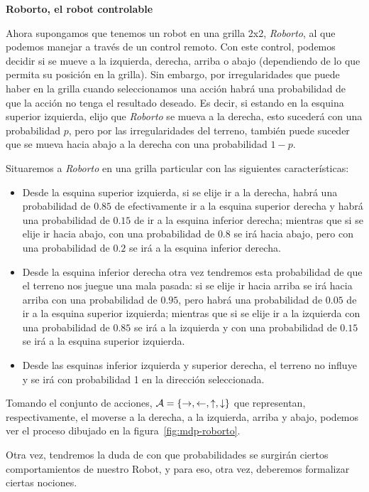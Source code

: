 \textbf{Roborto, el robot controlable}

Ahora supongamos que tenemos un robot en una grilla 2x2, \emph{Roborto}, al que
podemos manejar a través de un control remoto. Con este control, podemos
decidir si se mueve a la izquierda, derecha, arriba o abajo (dependiendo de lo
que permita su posición en la grilla). Sin embargo, por irregularidades que
puede haber en la grilla cuando seleccionamos una acción habrá una probabilidad
de que la acción no tenga el resultado deseado. Es decir, si estando en la
esquina superior izquierda, elijo que \emph{Roborto} se mueva a la derecha,
esto sucederá con una probabilidad $p$, pero por las irregularidades del
terreno, también puede suceder que se mueva hacia abajo a la derecha con una
probabilidad $1 - p$.

Situaremos a \emph{Roborto} en una grilla particular con las siguientes
características:

\begin{itemize}
	\item Desde la esquina superior izquierda, si se elije ir a la derecha, habrá una
	      probabilidad de $0.85$ de efectivamente ir a la esquina superior derecha y
	      habrá una probabilidad de $0.15$ de ir a la esquina inferior derecha; mientras
	      que si se elije ir hacia abajo, con una probabilidad de $0.8$ se irá hacia
	      abajo, pero con una probabilidad de $0.2$ se irá a la esquina inferior derecha.
	\item Desde la esquina inferior derecha otra vez tendremos esta probabilidad de que
	      el terreno nos juegue una mala pasada: si se elije ir hacia arriba se irá hacia
	      arriba con una probabilidad de $0.95$, pero habrá una probabilidad de $0.05$ de
	      ir a la esquina superior izquierda; mientras que si se elije ir a la izquierda
	      con una probabilidad de $0.85$ se irá a la izquierda y con una probabilidad de
	      $0.15$ se irá a la esquina superior izquierda.
	\item Desde las esquinas inferior izquierda y superior derecha, el terreno no influye
	      y se irá con probabilidad 1 en la dirección seleccionada.
\end{itemize}

Tomando el conjunto de acciones, $\mathcal{A} = \{\rightarrow, \leftarrow, \uparrow,
	\downarrow\}$ que representan, respectivamente, el moverse a la derecha, a la
izquierda, arriba y abajo, podemos ver el proceso dibujado en la
figura~\ref{fig:mdp-roborto}.

Otra vez, tendremos la duda de con que probabilidades se surgirán ciertos
comportamientos de nuestro Robot, y para eso, otra vez, deberemos formalizar
ciertas nociones.

